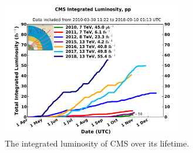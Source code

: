 \begin{figure}
\centering
\includegraphics[width=0.7\textwidth]{figs/int_lumi_cumulative_pp_2.pdf}
\caption{The integrated luminosity of CMS over its lifetime.}
\label{fig:lumi}
\end{figure}
